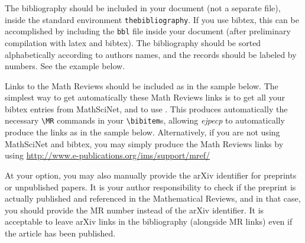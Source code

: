 \documentclass[ECP]{ejpecp} %
\begin{document}
The bibliography should be included in your document (not a separate file),
inside the standard environment \verb+thebibliography+. If you use bibtex,
this can be accomplished by including the \texttt{bbl} file inside your
document (after preliminary compilation with latex and bibtex). The
bibliography should be sorted alphabetically according to authors names, and
the records should be labeled by numbers. See the example below.

Links to the Math Reviews should be included as in the sample below. The
simplest way to get automatically these Math Reviews links is to get all your
bibtex entries from MathSciNet, and to use
\verb++. This produces automatically the necessary
\verb+\MR+ commands in your \verb+\bibitem+s, allowing \emph{ejpecp} to
automatically produce the links as in the sample below. Alternatively, if you
are not using MathSciNet and bibtex, you may simply produce the Math Reviews
links by using 
\url{http://www.e-publications.org/ims/support/mref/}

At your option, you may also manually provide the arXiv identifier for
preprints or unpublished papers. It is your author responsibility to check if
the preprint is actually published and referenced in the Mathematical Reviews,
and in that case, you should provide the MR number instead of the arXiv
identifier. It is acceptable to leave arXiv links in the bibliography
(alongside MR links) even if the article has been published.



%
%

\end{document}
